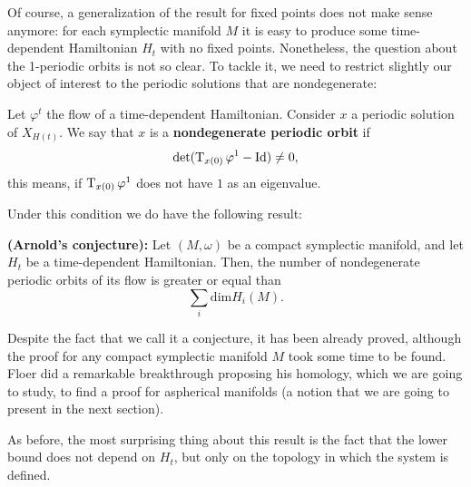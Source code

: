 Of course, a generalization of the result for fixed points does not make sense anymore: for each symplectic manifold $M$ it is easy to produce some time-dependent Hamiltonian $H_t$ with no fixed points. Nonetheless, the question about the 1-periodic orbits is not so clear. To tackle it, we need to restrict slightly our object of interest to the periodic solutions that are nondegenerate:

\begin{deff}
Let $\varphi^t$ the flow of a time-dependent Hamiltonian. Consider $x$ a periodic solution of $X_{H(t)}$. We say that $x$ is a {\bf nondegenerate periodic orbit} if
$$\det(\operatorname T_{x(0)} \varphi^1 - \text{Id}) \neq 0 ,$$
this means, if $\operatorname T_{x(0)} \varphi^1$ does not have $1$ as an eigenvalue.
\end{deff}

Under this condition we do have the following result:

\begin{theo}
{\bf (Arnold's conjecture):} Let $(M,\omega)$ be a compact symplectic manifold, and let $H_t$ be a time-dependent Hamiltonian. Then, the number of nondegenerate periodic orbits of its flow is greater or equal than
$$\sum_i \text{dim}H_i(M) .$$
\end{theo}

Despite the fact that we call it a conjecture, it has been already proved, although the proof for any compact symplectic manifold $M$ took some time to be found. Floer did a remarkable breakthrough proposing his homology, which we are going to study, to find a proof for aspherical manifolds (a notion that we are going to present in the next section).

As before, the most surprising thing about this result is the fact that the lower bound does not depend on $H_t$, but only on the topology in which the system is defined.
